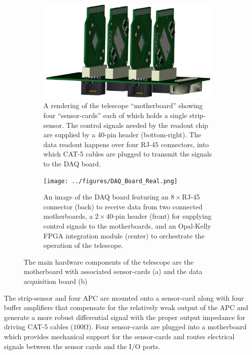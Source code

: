 \documentclass{PoS}
\begin{document}
\begin{figure}[h]
  \centering
  \begin{subfigure}[t]{0.45\textwidth}
    \includegraphics[width=\textwidth]{../figures/Half-Telescope-Full.png}
    \caption{\scriptsize A rendering of the telescope ``motherboard'' showing four
      ``sensor-cards'' each of which holds a single strip-sensor. The control
      signals needed by the readout chip are supplied by a 40-pin header
      (bottom-right). The data readout happens over four RJ-45 connectors, into
      which CAT-5 cables are plugged to transmit the signals to the DAQ board.}
\label{fig:hardware:motherboard}
  \end{subfigure}
  \hspace{.3in}
  \begin{subfigure}[t]{0.45\textwidth}
    \texttt{[image: ../figures/DAQ\_Board\_Real.png]}
    \caption{\scriptsize An image of the DAQ board featuring an $8\times$RJ-45
      connector (back) to receive data from two connected motherboards, a
      $2\times40$-pin header (front) for supplying control signals to the
      motherboards, and an Opal-Kelly FPGA integration module (center) to
      orchestrate the operation of the telescope.}
  \end{subfigure}
  \caption{The main hardware components of the telescope are the motherboard
    with associated sensor-cards (a) and the data acquisition board (b)}
\label{fig:hardware}
\end{figure}

The strip-sensor and four APC are mounted onto a sensor-card along
with four buffer amplifiers that compensate for the relatively weak output of
the APC and generate a more robust differential signal with the proper output
impedance for driving CAT-5 cables ($100\si{\ohm}$). Four sensor-cards are
plugged into a motherboard which provides mechanical support for the
sensor-cards and routes electrical signals between the sensor cards and the I/O
ports.
\end{document}
